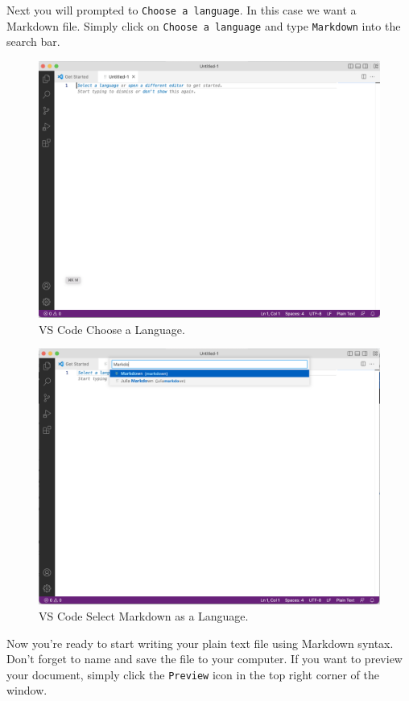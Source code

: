\documentclass[
]{book}
\begin{document}
Next you will prompted to \texttt{Choose\ a\ language}. In this case we want a Markdown file. Simply click on \texttt{Choose\ a\ language} and type \texttt{Markdown} into the search bar.

\begin{figure}
\centering
\includegraphics{images/vs-code-3.png}
\caption{VS Code Choose a Language.}
\end{figure}

\begin{figure}
\centering
\includegraphics{images/vs-code-4.png}
\caption{VS Code Select Markdown as a Language.}
\end{figure}

Now you're ready to start writing your plain text file using Markdown syntax. Don't forget to name and save the file to your computer. If you want to preview your document, simply click the \texttt{Preview} icon in the top right corner of the window.
\end{document}
